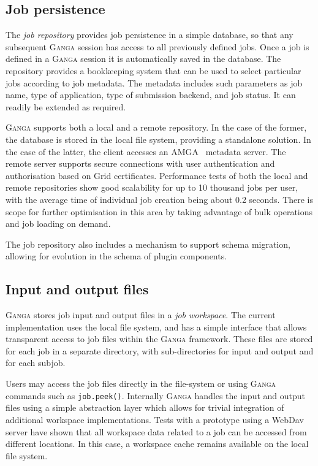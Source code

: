 \documentclass{elsart}
\def\ganga {\textsc{Ganga}\xspace}
\def\grid {Grid\xspace}
\begin{document}
\subsection{Job persistence}
\label{sec:persistence}
The \emph{job repository} provides job persistence in a simple database,
so that any subsequent \ganga session has access to all previously
defined jobs. Once a job is defined in a \ganga session it is automatically
saved in the database. The repository provides a bookkeeping system that can
be used to select particular jobs according to job metadata. The metadata
includes such parameters as job name, type of application, type of submission
backend, and job status. It can readily be extended as required.

\ganga supports both a local and a remote repository. In the
case of the former, the database is stored in the local file system,
providing a standalone solution. 
In the case of the latter,
the client accesses an AMGA~\cite{AMGA} metadata
server. The remote server supports secure connections with user
authentication and authorisation based on \grid certificates.
Performance tests of both the local and remote repositories show good
scalability for up to 10 thousand jobs per user, with the average time
of individual job creation being about 0.2 seconds. There is scope for
further optimisation in this area by taking advantage of bulk
operations and job loading on demand.

The job repository also includes a mechanism to support schema migration,
allowing for evolution in the schema of plugin components.

\subsection{Input and output files}

\ganga stores job input and output files in a \emph{job workspace}. 
The current implementation uses the local file system, and has a simple
interface that allows transparent access to job files within the
\ganga framework. These files are stored for each job in a separate
directory, with sub-directories for input and output and for each subjob.

Users may access the job files directly in the file-system or using \ganga commands
such as \texttt{job.peek()}. Internally \ganga handles the input and output
files using a simple abstraction layer which allows for trivial integration
of additional workspace implementations.
Tests with a prototype using a WebDav~\cite{WebDav}
server have shown that all workspace data related to a
job can be accessed from different locations. In this case, a workspace
cache remains available on the local file system.
\end{document}
